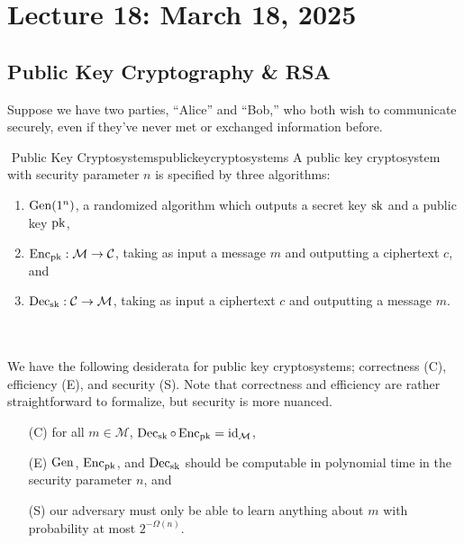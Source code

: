\section{Lecture 18: March 18, 2025}

    \subsection{Public Key Cryptography \& RSA}

        Suppose we have two parties, ``Alice'' and ``Bob,'' who both wish to communicate securely, even if they've never met or exchanged information before.
        \begin{definition}{\Stop\,\,Public Key Cryptosystems}{publickeycryptosystems}
            A public key cryptosystem with security parameter \(n\) is specified by three algorithms:
            \begin{enumerate}
                \item \(\operatorname{Gen}(1^n)\), a randomized algorithm which outputs a secret key \(\operatorname{sk}\) and a public key \(\operatorname{pk}\),
                \item \(\operatorname{Enc}_{\operatorname{pk}}:\mathcal{M}\to\mathcal{C}\), taking as input a message \(m\) and outputting a ciphertext \(c\), and 
                \item \(\operatorname{Dec}_{\operatorname{sk}}:\mathcal{C}\to\mathcal{M}\), taking as input a ciphertext \(c\) and outputting a message \(m\).
            \end{enumerate}
        \end{definition}
        \vphantom
        \\
        \\
        We have the following desiderata for public key cryptosystems; correctness (C), efficiency (E), and security (S). Note that correctness and efficiency are rather straightforward to formalize, but security is more nuanced. 
        \begin{enumerate}
            \item[(C)] for all \(m\in\mathcal{M}\), \(\operatorname{Dec}_{\operatorname{sk}}\circ \operatorname{Enc}_{\operatorname{pk}}=\operatorname{id}_{\mathcal{M}}\),
            \item[(E)] \(\operatorname{Gen}\), \(\operatorname{Enc}_{\operatorname{pk}}\), and \(\operatorname{Dec}_{\operatorname{sk}}\) should be computable in polynomial time in the security parameter \(n\), and 
            \item[(S)] our adversary must only be able to learn anything about \(m\) with probability at most \(2^{-\Omega(n)}\).
        \end{enumerate}
        \pagebreak
        \vphantom
